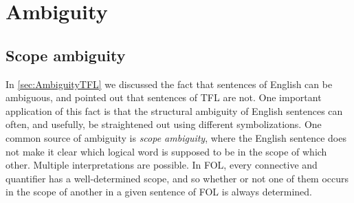 %			
%			
%			
%			

			
			\chapter{Ambiguity}
			
			
			
			\section{Scope ambiguity}
			
			In \cref{sec:AmbiguityTFL} we discussed the fact that sentences of English can be ambiguous, and pointed out that sentences of TFL are not. One important application of this fact is that the structural ambiguity of English sentences can often, and usefully, be straightened out using different symbolizations.  One common source of ambiguity is \emph{scope ambiguity}, where the English sentence does not make it clear which logical word is supposed to be in the scope of which other. Multiple interpretations are possible.  In FOL, every connective and quantifier has a well-determined scope, and so whether or not one of them occurs in the scope of another in a given sentence of FOL is always determined.
			

